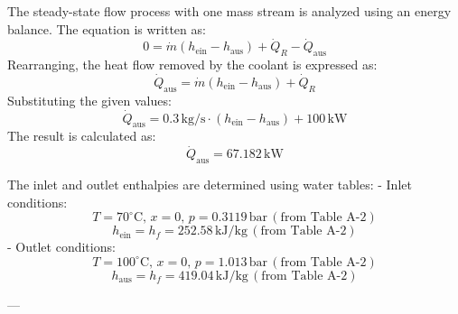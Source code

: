 The steady-state flow process with one mass stream is analyzed using an energy balance. The equation is written as:  
\[
0 = \dot{m} (h_{\text{ein}} - h_{\text{aus}}) + \dot{Q}_R - \dot{Q}_{\text{aus}}
\]  
Rearranging, the heat flow removed by the coolant is expressed as:  
\[
\dot{Q}_{\text{aus}} = \dot{m} (h_{\text{ein}} - h_{\text{aus}}) + \dot{Q}_R
\]  
Substituting the given values:  
\[
\dot{Q}_{\text{aus}} = 0.3 \, \text{kg/s} \cdot (h_{\text{ein}} - h_{\text{aus}}) + 100 \, \text{kW}
\]  
The result is calculated as:  
\[
\dot{Q}_{\text{aus}} = 67.182 \, \text{kW}
\]  

The inlet and outlet enthalpies are determined using water tables:  
- Inlet conditions:  
  \[
  T = 70^\circ\text{C}, \, x = 0, \, p = 0.3119 \, \text{bar} \, (\text{from Table A-2})
  \]  
  \[
  h_{\text{ein}} = h_f = 252.58 \, \text{kJ/kg} \, (\text{from Table A-2})
  \]  
- Outlet conditions:  
  \[
  T = 100^\circ\text{C}, \, x = 0, \, p = 1.013 \, \text{bar} \, (\text{from Table A-2})
  \]  
  \[
  h_{\text{aus}} = h_f = 419.04 \, \text{kJ/kg} \, (\text{from Table A-2})
  \]  

---
